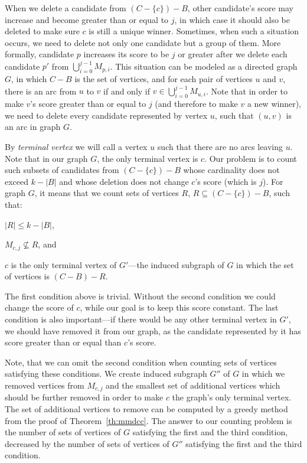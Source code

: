 When we delete a candidate from $(C-\{c\})-B$, other candidate's score may increase and become greater than or equal to $j$, in which case it should also be deleted to make sure $c$ is still a unique winner.
Sometimes, when such a situation occurs, we need to delete not only one candidate but a group of them.
More formally, candidate $p$ increases its score to be $j$ or greater after we delete each candidate $p'$ from $\bigcup_{i=0}^{j-1}M_{p,i}$.
This situation can be modeled as a directed graph $G$, in which $C-B$ is the set of vertices, and for each pair of vertices $u$ and $v$, there is an arc from $u$ to $v$ if and only if $v\in\bigcup_{i=0}^{j-1}M_{u,i}$.
Note that in order to make $v$'s score greater than or equal to $j$ (and therefore to make $v$ a new winner), we need to delete every candidate represented by vertex $u$, such that $(u,v)$ is an arc in graph $G$.

By \emph{terminal vertex} we will call a vertex $u$ such that there are no arcs leaving $u$.
Note that in our graph $G$, the only terminal vertex is $c$.
Our problem is to count such subsets of candidates from $(C-\{c\})-B$ whose cardinality does not exceed $k-|B|$ and whose deletion does not change $c$'s score (which is $j$).
For graph $G$, it means that we count sets of vertices $R$, $R\subseteq (C-\{c\})-B$, such that:
\begin{Enumerate}
	\item $|R|\le k-|B|$,
	\item $M_{c,j}\nsubseteq R$, and
	\item $c$ is the only terminal vertex of $G'$---the induced subgraph of $G$ in which the set of vertices is $(C-B)-R$.
\end{Enumerate}
The first condition above is trivial.
Without the second condition we could change the score of $c$, while our goal is to keep this score constant.
The last condition is also important---if there would be any other terminal vertex in $G'$, we should have removed it from our graph, as the candidate represented by it has score greater than or equal than $c$'s score.

Note, that we can omit the second condition when counting sets of vertices satisfying these conditions.
We create induced subgraph $G''$ of $G$ in which we removed vertices from $M_{c,j}$ and the smallest set of additional vertices which should be further removed in order to make $c$ the graph's only terminal vertex.
The set of additional vertices to remove can be computed by a greedy method from the proof of Theorem~\ref{th:mmdcc}.
The answer to our counting problem is the number of sets of vertices of $G$ satisfying the first and the third condition, decreased by the number of sets of vertices of $G''$ satisfying the first and the third condition.

